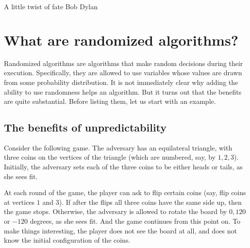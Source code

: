 %



\ChapterPrefix{}
\ChapterGen{}

\setlength{\epigraphwidth}{8cm}

\QuotePExt{%
   \noindent%
   People tell me it's a sin

   To know and feel too much within.

   I still believe she was my twin, but I lost the ring.

   She was born in spring, but I was born too late.

   Blame it on a simple twist of fate.

}%
{A little twist of fate}%
{Bob Dylan}



\section{What are randomized algorithms?}

Randomized algorithms are algorithms that make random decisions during
their execution. Specifically, they are allowed to use variables whose
values are drawn from some probability distribution. It is not
immediately clear why adding the ability to use randomness helps an
algorithm. But it turns out that the benefits are quite
substantial. Before listing them, let us start with an example.



\subsection{The benefits of unpredictability}

Consider the following game. The adversary has an equilateral triangle,
with three coins on the vertices of the triangle (which are numbered,
say, by $1,2,3$). Initially, the adversary sets each of the three
coins to be either heads or tails, as she sees fit.

At each round of the game, the player can ask to flip certain coins
(say, flip coins at vertices $1$ and $3$). If after the flips all three
coins have the same side up, then the game stops. Otherwise, the
adversary is allowed to rotate the board by $0, 120$ or $-120$
degrees, as she sees fit. And the game continues from this point
on. To make things interesting, the player does not see the board at
all, and does not know the initial configuration of the coins.



